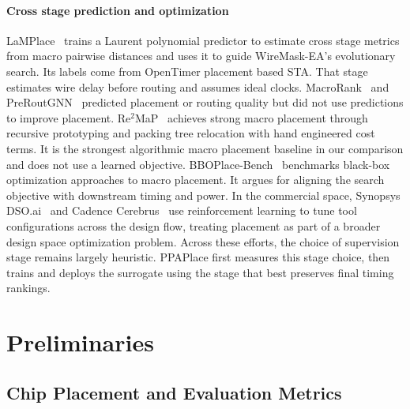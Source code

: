 \documentclass[sigconf,anonymous,review,9pt]{acmart}
\begin{document}
\paragraph{Cross stage prediction and optimization}
LaMPlace~\cite{lamplace2025} trains a Laurent polynomial predictor to
estimate cross stage metrics from macro pairwise distances and uses it
to guide WireMask-EA's evolutionary search. Its labels come from
OpenTimer placement based STA. That stage estimates wire delay before
routing and assumes ideal clocks.
MacroRank~\cite{macrorank2023} and
PreRoutGNN~\cite{preroutgnn2024} predicted placement or routing
quality but did not use predictions to improve placement.
Re$^2$MaP~\cite{re2map2025} achieves strong macro placement through
recursive prototyping and packing tree relocation with hand engineered
cost terms. It is the strongest algorithmic macro placement baseline
in our comparison and does not use a learned objective.
BBOPlace-Bench~\cite{bboplacebench2025} benchmarks black-box
optimization approaches to macro placement. It argues for aligning
the search objective with downstream timing and power. In the commercial space,
Synopsys DSO.ai~\cite{dsoai2025} and Cadence
Cerebrus~\cite{cerebrus2025} use reinforcement learning to tune tool
configurations across the design flow, treating placement as part of
a broader design space optimization problem. Across these efforts, the
choice of supervision stage remains largely heuristic. PPAPlace first
measures this stage choice, then trains and deploys the surrogate using
the stage that best preserves final timing rankings.


\section{Preliminaries}
\label{sec:prelim}

\subsection{Chip Placement and Evaluation Metrics}
\end{document}
